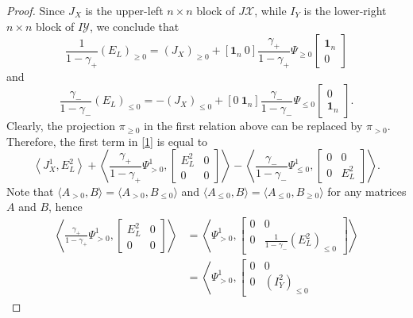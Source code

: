 \documentclass{amsart}
\theoremstyle{definition}
\theoremstyle{remark}
\numberwithin{equation}{section}
\numberwithin{theorem}{section}
\begin{document}
\begin{proof}
Since $J_X$ is the upper-left $n\times n$ block of $J {{\mathcal X}}$, while
$I_Y$ is the lower-right $n\times n$ block of $I {{\mathcal Y}}$,
we conclude that
$$
\frac {1}{1-\gamma_+} (E_L)_{\geq 0} =   (J_X )_{\geq 0} +
\left [{\mathbf 1}_n\ 0\right ] \frac {\gamma_+}{1-\gamma_+} {\Psi}_{\geq 0} 
\left [\begin{array}{c} {\mathbf 1}_n\\ 0\end{array} \right ]
$$
and
$$
\frac {\gamma_-}{1-\gamma_-} (E_L)_{\leq 0} =   -(J_X )_{\leq 0} +
\left [0\ {\mathbf 1}_n\right ] \frac {\gamma_-}{1-\gamma_-} {\Psi}_{\leq 0} \left [\begin{array}{c} 0\\ {\mathbf 1}_n\end{array} \right ].
$$
Clearly, the projection $\pi_{\geq 0}$ in the first relation above can be replaced by $\pi_{>0}$.
Therefore, the first term in \eqref{1} is equal to
\[
 \left \langle  
J^1_X, E_L^2 \right \rangle +
 \left \langle  \frac{\gamma_+}{1-\gamma_+} 
{\Psi}^1_{>0}, \left [\begin{array}{cc} E_L^2 & 0\\ 0 & 0 \end{array}\right ]\right\rangle - 
\left\langle\frac{\gamma_-}{1-\gamma_-}{\Psi}^1_{\leq 0}, \left [\begin{array}{cc} 0 & 0\\ 0 &E_L^2  
\end{array}\right ]\right\rangle.
\]
Note that $\langle A_{>0},B\rangle=\langle A_{>0}, B_{\leq 0}\rangle$ 
and $\langle A_{\leq 0},B\rangle=\langle A_{\leq 0}, B_{\geq 0}\rangle$ 
for any matrices $A$ and $B$, hence
\begin{equation*}
\begin{aligned} 
 \left\langle  \frac{\gamma_+}{1-\gamma_+} {\Psi}^1_{>0}, 
  \left[
 \begin{array}{cc} E_L^2 & 0\\ 
                       0 & 0 \end{array}
\right ]\right\rangle & =
\left\langle  {\Psi}^1_{>0}, 
\left[
\begin{array}{cc} 0 & 0\\ 
                  0 & \frac{1}{1-\gamma_-}(E_L^2)_{\leq 0} \end{array}
\right]\right\rangle\\
 & =\left \langle  {\Psi}^1_{>0}, 
 \left[
 \begin{array}{cc} 0 & 0\\ 
                   0 & ( I_Y^2 )_{\leq 0} \end{array}

\end{aligned}
\end{equation*}
\end{proof}
\end{document}

